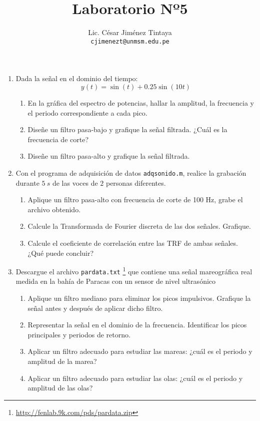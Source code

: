 \documentclass[a4paper,11pt,final]{article}
\begin{document}
  \title{Laboratorio Nº5}
  \author{Lic. César Jiménez Tintaya\\ \small{\texttt{cjimenezt@unmsm.edu.pe}}}
  \date{}
  \maketitle

  \begin{enumerate}
    \item Dada la señal en el dominio del tiempo:
      $$y\left(t\right) = \sin\left(t\right) + 0.25\sin\left(10t\right)$$

      \begin{enumerate}
        \item En la gráfica del espectro de potencias, hallar la amplitud,
              la frecuencia y el periodo correspondiente a cada pico.
        \item Diseñe un filtro pasa-bajo y grafique la señal filtrada.
              ¿Cuál es la frecuencia de corte?
        \item Diseñe un filtro pasa-alto y grafique la señal filtrada.
      \end{enumerate}

    \item Con el programa de adquisición de datos \texttt{adqsonido.m}, realice
      la grabación durante $5\ s$ de las voces de $2$ personas diferentes.

      \begin{enumerate}
        \item Aplique un filtro pasa-alto con frecuencia de corte de 100 Hz,
              grabe el archivo obtenido.
        \item Calcule la Transformada de Fourier discreta de las dos señales.
              Grafique.
        \item Calcule el coeficiente de correlación entre las TRF de ambas
              señales. ¿Qué puede concluir?
      \end{enumerate}

    \item Descargue el archivo \texttt{pardata.txt}
      \footnote{\url{http://fenlab.9k.com/pds/pardata.zip}} que contiene una
      señal mareográfica real medida en la bahía de Paracas con un sensor
      de nivel ultrasónico

      \begin{enumerate}
        \item Aplique un filtro mediano para eliminar los picos impulsivos. Grafique la señal antes y después de aplicar dicho filtro.
        \item Representar la señal en el dominio de la frecuencia. Identificar los picos principales y periodos de retorno.
        \item Aplicar un filtro adecuado para estudiar las mareas: ¿cuál es el periodo y amplitud de la marea?
        \item Aplicar un filtro adecuado para estudiar las olas: ¿cuál es el periodo y amplitud de las olas?
      \end{enumerate}


\end{enumerate}
\end{document}
